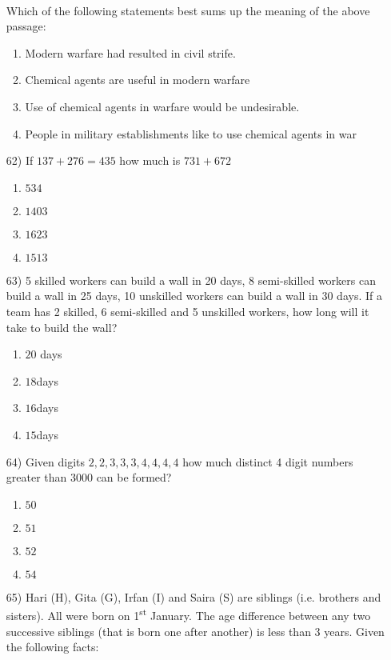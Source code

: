 \documentclass[journal]{IEEEtran}
\begin{document}
\begin{enumerate}
\bigskip \\
Which of the following statements best sums up the meaning of the above passage:
\begin{enumerate}
    \item Modern warfare had resulted in civil strife.
    \item Chemical agents are useful in modern warfare
    \item Use of chemical agents in warfare would be undesirable.
    \item People in military establishments like to use chemical agents in war
\end{enumerate}    
\item[62)] If $137+276=435$ how much is $731+672$
\begin{multicols}{2}
\begin{enumerate}
    \item $534$
    \item $1403$
    \item $1623$
    \item $1513$
\end{enumerate}    
\end{multicols}  
\item[63)] 5 skilled workers can build a wall in 20 days, 8 semi-skilled workers can build a wall in 25 days, 10 unskilled workers can build a wall in 30 days. If a team has 2 skilled, 6 semi-skilled and 5 unskilled workers, how long will it take to build the wall?
\begin{multicols}{2}
\begin{enumerate}
    \item $20$ days
    \item $18$days
    \item $16$days
    \item $15$days
\end{enumerate}    
\end{multicols}
\item[64)] Given digits $2,2,3,3,3,4,4,4,4$ how much distinct 4 digit numbers greater than 3000 can be formed?
\begin{multicols}{2}
\begin{enumerate}
    \item $50$
    \item $51$
    \item $52$
    \item $54$
\end{enumerate}    
\end{multicols}
\item[65)] Hari (H), Gita (G), Irfan (I) and Saira (S) are siblings (i.e. brothers and sisters). All were born on 1\textsuperscript{st} January. The age difference between any two successive siblings (that is born one after another) is less than 3 years. Given the following facts:


\end{enumerate}
\end{document}

